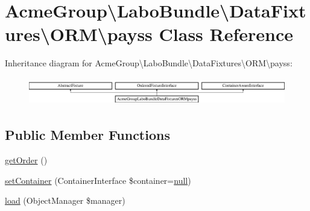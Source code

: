 \hypertarget{class_acme_group_1_1_labo_bundle_1_1_data_fixtures_1_1_o_r_m_1_1payss}{\section{Acme\+Group\textbackslash{}Labo\+Bundle\textbackslash{}Data\+Fixtures\textbackslash{}O\+R\+M\textbackslash{}payss Class Reference}
\label{class_acme_group_1_1_labo_bundle_1_1_data_fixtures_1_1_o_r_m_1_1payss}
}
Inheritance diagram for Acme\+Group\textbackslash{}Labo\+Bundle\textbackslash{}Data\+Fixtures\textbackslash{}O\+R\+M\textbackslash{}payss\+:\begin{figure}[H]
\begin{center}
\leavevmode
\includegraphics[height=1.232123cm]{class_acme_group_1_1_labo_bundle_1_1_data_fixtures_1_1_o_r_m_1_1payss}
\end{center}
\end{figure}
\subsection*{Public Member Functions}
\begin{DoxyCompactItemize}
\item 
\hyperlink{class_acme_group_1_1_labo_bundle_1_1_data_fixtures_1_1_o_r_m_1_1payss_a29ab4f9f471a5cd877201634caa281e8}{get\+Order} ()
\item 
\hyperlink{class_acme_group_1_1_labo_bundle_1_1_data_fixtures_1_1_o_r_m_1_1payss_a5dacac9d2e77fe17d2a17545cfe31caa}{set\+Container} (Container\+Interface \$container=\hyperlink{validate_8js_afb8e110345c45e74478894341ab6b28e}{null})
\item 
\hyperlink{class_acme_group_1_1_labo_bundle_1_1_data_fixtures_1_1_o_r_m_1_1payss_ab48dfee8786a2eb2bf78bcaafb291ffe}{load} (Object\+Manager \$manager)
\end{DoxyCompactItemize}



